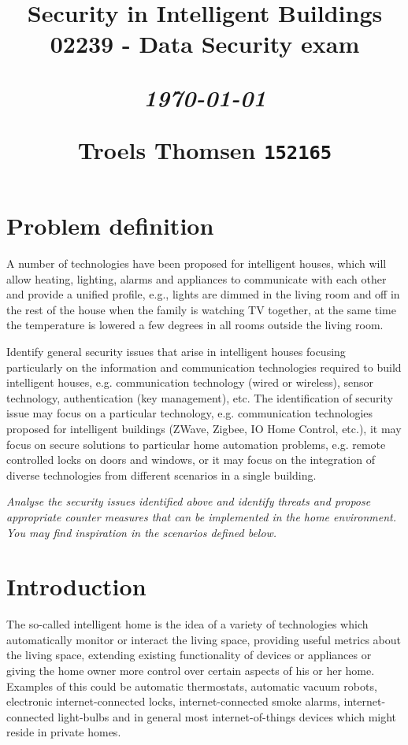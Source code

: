 \documentclass[12pt]{article}
\title{
  \vspace{4cm}
  \begin{flushleft}
  \Large{\textbf{Security in Intelligent Buildings}} \\
  \large{02239 - Data Security exam} \\
  \end{flushleft}
  \vspace{0cm}
  \begin{flushleft}
  \small
  \textit{\today}
  \end{flushleft}
  \vspace{12cm}
  \begin{flushleft}
  \small
  Troels Thomsen \texttt{152165}
  \end{flushleft}
}
\date{
}
\begin{document}
\clearpage
{}
\thispagestyle{empty}
\maketitle

\newpage

\tableofcontents

\newpage


\section{Problem definition}
\label{sec:Problem definition}

A number of technologies have been proposed for intelligent houses, which will allow heating, lighting, alarms and appliances to communicate with each other and provide a unified profile, e.g., lights are dimmed in the living room and off in the rest of the house when the family is watching TV together, at the same time the temperature is lowered a few degrees in all rooms outside the living room.

Identify general security issues that arise in intelligent houses focusing particularly on the information and communication technologies required to build intelligent houses, e.g. communication technology (wired or wireless), sensor technology, authentication (key management), etc. The identification of security issue may focus on a particular technology, e.g. communication technologies proposed for intelligent buildings (ZWave, Zigbee, IO Home Control, etc.), it may focus on secure solutions to particular home automation problems, e.g. remote controlled locks on doors and windows, or it may focus on the integration of diverse technologies from different scenarios in a single building.

\textit{Analyse the security issues identified above and identify threats and propose appropriate counter measures that can be implemented in the home environment. You may find inspiration in the scenarios defined below.}

\newpage

\section{Introduction}
\label{sec:Introduction}

The so-called intelligent home is the idea of a variety of technologies which automatically monitor or interact the living space, providing useful metrics about the living space, extending existing functionality of devices or appliances or giving the home owner more control over certain aspects of his or her home. Examples of this could be automatic thermostats, automatic vacuum robots, electronic internet-connected locks, internet-connected smoke alarms, internet-connected light-bulbs and in general most internet-of-things devices which might reside in private homes.
\end{document}
